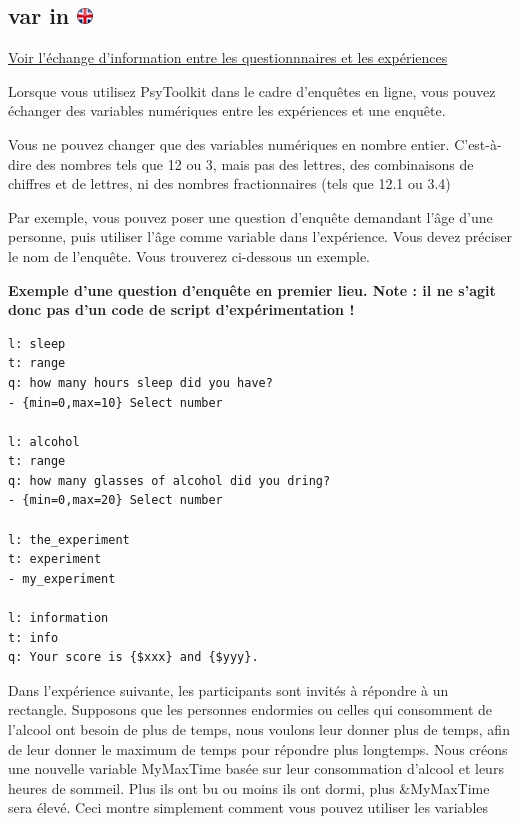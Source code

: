 \documentclass[
]{book}
\begin{document}
\hypertarget{var-in}{%
\subsection[var in ]{\texorpdfstring{var in \href{https://www.psytoolkit.org/doc3.4.0/syntax.html\#_var_in}{\protect\includegraphics{img/ukflag.png}}}{var in }}\label{var-in}}

\protect\hyperlink{s11}{Voir l'échange d'information entre les questionnnaires et les expériences}

Lorsque vous utilisez PsyToolkit dans le cadre d'enquêtes en ligne, vous pouvez échanger des variables numériques entre les expériences et une enquête.

Vous ne pouvez changer que des variables numériques en nombre entier. C'est-à-dire des nombres tels que 12 ou 3, mais pas des lettres, des combinaisons de chiffres et de lettres, ni des nombres fractionnaires (tels que 12.1 ou 3.4)

Par exemple, vous pouvez poser une question d'enquête demandant l'âge d'une personne, puis utiliser l'âge comme variable dans l'expérience. Vous devez préciser le nom de l'enquête. Vous trouverez ci-dessous un exemple.

\textbf{Exemple d'une question d'enquête en premier lieu. Note : il ne s'agit donc pas d'un code de script d'expérimentation !}

\begin{verbatim}
l: sleep
t: range
q: how many hours sleep did you have?
- {min=0,max=10} Select number

l: alcohol
t: range
q: how many glasses of alcohol did you dring?
- {min=0,max=20} Select number

l: the_experiment
t: experiment
- my_experiment

l: information
t: info
q: Your score is {$xxx} and {$yyy}.
\end{verbatim}

Dans l'expérience suivante, les participants sont invités à répondre à un rectangle. Supposons que les personnes endormies ou celles qui consomment de l'alcool ont besoin de plus de temps, nous voulons leur donner plus de temps, afin de leur donner le maximum de temps pour répondre plus longtemps. Nous créons une nouvelle variable MyMaxTime basée sur leur consommation d'alcool et leurs heures de sommeil. Plus ils ont bu ou moins ils ont dormi, plus \&MyMaxTime sera élevé. Ceci montre simplement comment vous pouvez utiliser les variables
\end{document}
